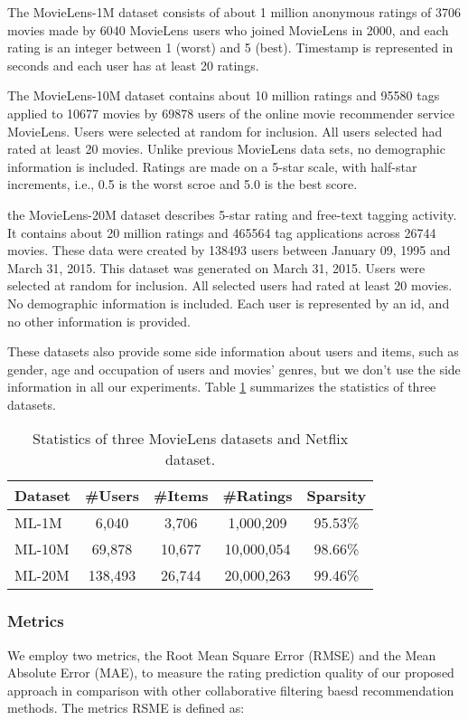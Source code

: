 \documentclass{sig-alternate-05-2015}
\begin{document}
The MovieLens-1M dataset consists of about 1 million anonymous ratings of 3706 movies
made by 6040 MovieLens users who joined MovieLens in 2000,
and each rating is an integer between 1 (worst) and 5 (best).
Timestamp is represented in seconds and each user has at least 20 ratings.

The MovieLens-10M dataset contains about 10 million ratings and 95580 tags
applied to 10677 movies by 69878 users of the online movie recommender service MovieLens.
Users were selected at random for inclusion. All users selected had rated
at least 20 movies. Unlike previous MovieLens data sets, no demographic information is included.
Ratings are made on a 5-star scale, with half-star increments, i.e., 0.5 is the worst scroe
and 5.0 is the best score.

the MovieLens-20M dataset describes 5-star rating and free-text tagging activity.
It contains about 20 million ratings and 465564 tag applications across 26744 movies.
These data were created by 138493 users between January 09, 1995 and March 31, 2015.
This dataset was generated on March 31, 2015.
Users were selected at random for inclusion. All selected users had rated
at least 20 movies. No demographic information is included.
Each user is represented by an id, and no other information is provided.

These datasets also provide some side information about users and items,
such as gender, age and occupation of users and movies' genres,
but we don't use the side information in all our experiments.
Table \ref{tab:statistics} summarizes the statistics of three datasets.

\begin{table}[htpb]
    \centering
    \caption{Statistics of three MovieLens datasets and Netflix dataset.}
    \label{tab:statistics}
    \begin{tabular}{|l|c|c|c|c|}
        \hline
        \textbf{Dataset} & \textbf{\#Users} & \textbf{\#Items} & \textbf{\#Ratings} & \textbf{Sparsity} \\
        \hline
        ML-1M  & 6,040    & 3,706  & 1,000,209   & 95.53\% \\
        ML-10M & 69,878   & 10,677 & 10,000,054  & 98.66\% \\
        ML-20M & 138,493  & 26,744 & 20,000,263  & 99.46\% \\
        \hline
    \end{tabular}
\end{table}

\subsubsection{Metrics}
We employ two metrics, the Root Mean Square Error (RMSE) and the Mean Absolute Error (MAE),
to measure the rating prediction quality of our proposed approach in comparison with other
collaborative filtering baesd recommendation methods.
The metrics RSME is defined as:
\end{document}
